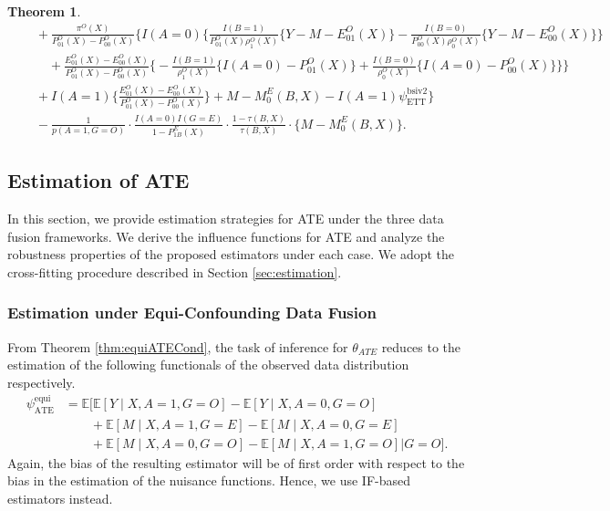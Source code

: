 \documentclass[10pt]{article}
\newtheorem{theorem}{Theorem}
\newcommand{\E}{\mathbb{E}}
\begin{document}
\begin{theorem}
{\begin{align*}
&\quad+\frac{\pi^O(X)}{P_{01}^O(X)-P_{00}^O(X)}\Big\{I(A=0)\big\{\frac{I(B=1)}{P_{01}^O(X)\rho_1^O(X)}\{Y-M-E_{01}^O(X)\}-\frac{I(B=0)}{P_{00}^O(X)\rho_0^O(X)}\{Y-M-E_{00}^O(X)\}\big\}\\
&\quad\quad+\frac{E_{01}^O(X)-E_{00}^O(X)}{P_{01}^O(X)-P_{00}^O(X)}\big\{-\frac{I(B=1)}{\rho_1^O(X)}\{I(A=0)-P_{01}^O(X)\}+\frac{I(B=0)}{\rho_0^O(X)}\{I(A=0)-P_{00}^O(X)\}\big\}\Big\}\\
&\quad+I(A=1)\{\frac{E_{01}^O(X)-E_{00}^O(X)}{P_{01}^O(X)-P_{00}^O(X)}\}+M-M_0^E(B,X)-I(A=1)\psi^{\text{bsiv2}}_{\text{ETT}}\Bigg\}\\
&\quad-\frac{1}{p(A=1,G=O)}\cdot\frac{I(A=0)I(G=E)}{1-P_{1B}^E(X)}\cdot\frac{1-\tau(B,X)}{\tau(B,X)}\cdot\{M-M_0^E(B,X)\}.
\end{align*}
}
\end{theorem}





\subsection{Estimation of ATE}


In this section, we provide estimation strategies for ATE under the three data fusion frameworks. We derive the influence functions for ATE and analyze the robustness properties of the proposed estimators under each case. We adopt the cross-fitting procedure described in Section \ref{sec:estimation}.

\subsubsection{Estimation under Equi-Confounding Data Fusion}




From Theorem \ref{thm:equiATECond}, the task of inference for $\theta_{ATE}$ reduces to the estimation of the following functionals of the observed data distribution respectively.
\begin{align*}
\psi_{\text{ATE}}^{\text{equi}} 
&=\E\big[
\E[Y\mid X,A=1,G=O]-\E[Y\mid X,A=0,G=O]\\
&\quad\quad+\E[M\mid X,A=1,G=E]-\E[M\mid X,A=0,G=E]\\
&\quad\quad+\E[M\mid X,A=0,G=O]-\E[M\mid X,A=1,G=O]
\big| G=O\big].
\end{align*}
Again, the bias of the resulting estimator will be of first order with respect to the bias in the estimation of the nuisance functions. Hence, we use IF-based estimators instead.
\end{document}
